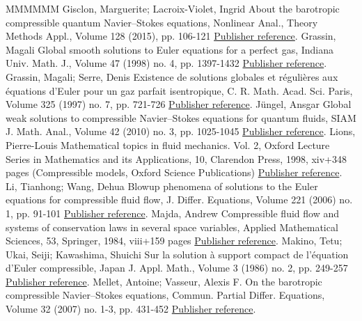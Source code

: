 \begin{thebibliography}{MMMMMM}
 Gisclon, Marguerite; Lacroix-Violet, Ingrid About the barotropic compressible quantum Navier–Stokes equations, Nonlinear Anal., Theory Methods Appl., Volume 128 (2015), pp. 106-121 \href{https://ahl.centre-mersenne.org/item/AHL_2018__1__47_0/#Gis-VV15}{Publisher reference}.
 Grassin, Magali Global smooth solutions to Euler equations for a perfect gas, Indiana Univ. Math. J., Volume 47 (1998) no. 4, pp. 1397-1432 \href{https://ahl.centre-mersenne.org/item/AHL_2018__1__47_0/#Gra98}{Publisher reference}.
 Grassin, Magali; Serre, Denis Existence de solutions globales et régulières aux équations d’Euler pour un gaz parfait isentropique, C. R. Math. Acad. Sci. Paris, Volume 325 (1997) no. 7, pp. 721-726 \href{https://ahl.centre-mersenne.org/item/AHL_2018__1__47_0/#GrSe97}{Publisher reference}.
 Jüngel, Ansgar Global weak solutions to compressible Navier–Stokes equations for quantum fluids, SIAM J. Math. Anal., Volume 42 (2010) no. 3, pp. 1025-1045 \href{https://ahl.centre-mersenne.org/item/AHL_2018__1__47_0/#Jungel}{Publisher reference}.
 Lions, Pierre-Louis Mathematical topics in fluid mechanics. Vol. 2, Oxford Lecture Series in Mathematics and its Applications, 10, Clarendon Press, 1998, xiv+348 pages (Compressible models, Oxford Science Publications) \href{https://ahl.centre-mersenne.org/item/AHL_2018__1__47_0/#Lio98}{Publisher reference}.
 Li, Tianhong; Wang, Dehua Blowup phenomena of solutions to the Euler equations for compressible fluid flow, J. Differ. Equations, Volume 221 (2006) no. 1, pp. 91-101 \href{https://ahl.centre-mersenne.org/item/AHL_2018__1__47_0/#LiWa06}{Publisher reference}.
 Majda, Andrew Compressible fluid flow and systems of conservation laws in several space variables, Applied Mathematical Sciences, 53, Springer, 1984, viii+159 pages \href{https://ahl.centre-mersenne.org/item/AHL_2018__1__47_0/#Majda}{Publisher reference}.
 Makino, Tetu; Ukai, Seiji; Kawashima, Shuichi Sur la solution à support compact de l’équation d’Euler compressible, Japan J. Appl. Math., Volume 3 (1986) no. 2, pp. 249-257 \href{https://ahl.centre-mersenne.org/item/AHL_2018__1__47_0/#MUK86}{Publisher reference}.
 Mellet, Antoine; Vasseur, Alexis F. On the barotropic compressible Navier–Stokes equations, Commun. Partial Differ. Equations, Volume 32 (2007) no. 1-3, pp. 431-452 \href{https://ahl.centre-mersenne.org/item/AHL_2018__1__47_0/#MelletVasseur}{Publisher reference}.

\end{thebibliography}
